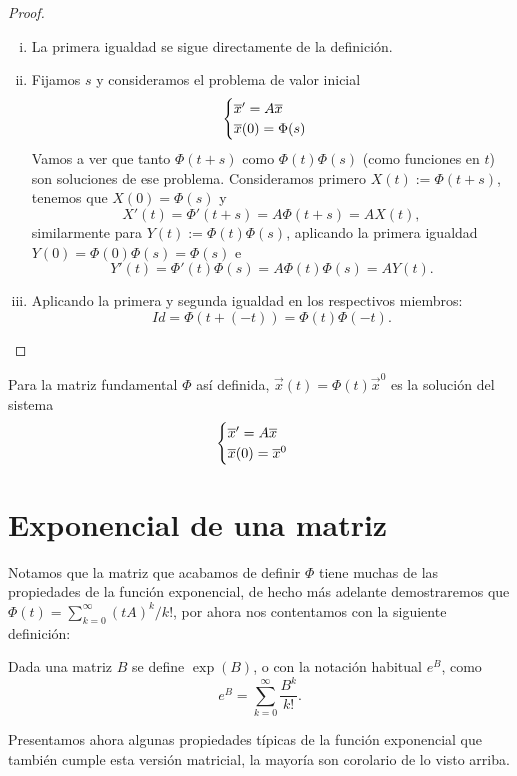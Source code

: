 \documentclass[../ecuaciones_diferenciales.tex]{subfiles}
\begin{document}
\begin{proof}
	\begin{enumerate}[i), wide, labelwidth=0pt, labelindent=0pt]
		\item La primera igualdad se sigue directamente de la definición.

		\item Fijamos \(s\) y consideramos el problema de valor inicial
			\[\begin{cases}\overline{x}' = A\overline{x} \\ \overline{x}(0) = \Phi(s) \end{cases}\]
		      Vamos a ver que tanto \(\Phi(t + s)\) como \(\Phi(t)\Phi(s)\) (como
		      funciones en \(t\)) son soluciones de ese problema. Consideramos
		      primero \(X(t) := \Phi(t + s)\), tenemos que \(X(0) = \Phi(s)\) y
		      \[X'(t) = \Phi'(t + s) = A \Phi(t + s) = A X(t),\]
		      similarmente para \(Y(t) := \Phi(t)\Phi(s)\), aplicando la primera
		      igualdad \(Y(0) = \Phi(0)\Phi(s) = \Phi(s)\) e
		      \[Y'(t) = \Phi'(t)\Phi(s) = A \Phi(t)\Phi(s) = A Y(t).\]

		\item Aplicando la primera y segunda igualdad en los respectivos
		      miembros:
		      \[\mathit{Id} = \Phi(t + (-t)) = \Phi(t)\Phi(-t).\]
	\end{enumerate}
\end{proof}

Para la matriz fundamental \(\Phi\) así definida, 
\(\vec{x}(t) = \Phi(t)\vec{x}^0\) es la solución del sistema
\[\begin{cases}\overline{x}' = A\overline{x} \\ \overline{x}(0) = \overline{x}^0\end{cases}\]

\section{Exponencial de una matriz}

Notamos que la matriz que acabamos de definir \(\Phi\) tiene muchas de las
propiedades de la función exponencial, de hecho más adelante demostraremos que
\(\Phi(t) = \sum_{k=0}^\infty (tA)^k/k!\), por ahora nos contentamos con la
siguiente definición:

\begin{definition}
	Dada una matriz \(B\) se define \(\exp(B)\), o con la notación habitual
	\(e^B\), como
	\[e^B = \sum_{k = 0}^\infty \frac{B^k}{k!}.\]
\end{definition}

Presentamos ahora algunas propiedades típicas de la función exponencial que
también cumple esta versión matricial, la mayoría son corolario de lo visto
arriba.
\end{document}

